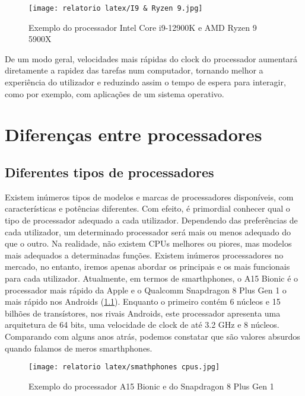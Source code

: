 \documentclass{report}
\begin{document}
\begin{figure}[h!]
\centering
  \texttt{[image: relatorio latex/I9 \& Ryzen 9.jpg]}
  \caption{Exemplo do processador \ac{Intel} Core i9-12900K e \ac{AMD} Ryzen 9 5900X}
  \label{fig:I9 Ryzen9}
\end{figure}


De um modo geral, velocidades mais rápidas do clock do processador aumentará diretamente a rapidez das tarefas num computador, tornando melhor a experiência do utilizador e reduzindo assim o tempo de espera para interagir, como por exemplo, com aplicações de um sistema operativo.




\chapter{Diferenças entre processadores}
\label{chap.Diferenças entre processadores}
\section{Diferentes tipos de processadores}

Existem inúmeros tipos de modelos e marcas de processadores disponíveis, com características e potências diferentes. Com efeito, é primordial conhecer qual o tipo de processador adequado a cada utilizador. Dependendo das preferências de cada utilizador, um determinado processador será mais ou menos adequado do que o outro. Na realidade, não existem \ac{CPU}s melhores ou piores, mas modelos mais adequados a determinadas funções\cite{Diferentes1}. 
Existem inúmeros processadores no mercado, no entanto, iremos apenas abordar os principais e os mais funcionais para cada utilizador. Atualmente, em termos de smarthphones, o A15 Bionic é o processador mais rápido da Apple e o Qualcomm Snapdragon 8 Plus Gen 1 o mais rápido nos Androids (\ref{fig:SP CPUs})\cite{Diferentes3}. Enquanto o primeiro contém 6 núcleos e 15 bilhões de transístores, nos rivais Androids, este processador apresenta uma arquitetura de 64 bits, uma velocidade de clock de até 3.2 GHz e 8 núcleos. Comparando com alguns anos atrás, podemos constatar que são valores absurdos quando falamos de meros smarthphones\cite{AppleA15}\cite{Snapdragon8}.

\begin{figure}[h!]
\centering
  \texttt{[image: relatorio latex/smathphones cpus.jpg]}
  \caption{Exemplo do processador A15 Bionic e do Snapdragon 8 Plus Gen 1}
  \label{fig:SP CPUs}
\end{figure}
\end{document}
